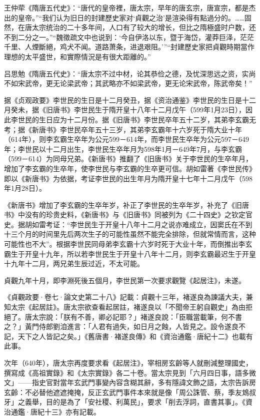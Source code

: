 王仲荦《隋唐五代史》：“唐代的皇帝裡，唐太宗，早年的唐玄宗，唐宣宗，都是杰出的皇帝。”“我们认为旧日的封建歷史家对‘貞觀之治’是渲染得有點過分的。……固然，在唐太宗统治的二十多年间，人口有了较大的增长，但比之隋極盛时户数，还不到二分之一。”“魏徵疏文中也说到：‘今自伊洛以东，暨于海岱，灌莽巨泽，茫茫千里、人煙斷絕，鸡犬不闻。道路萧条，进退艰阻。’”“封建歷史家把貞觀時期當作理想的太平盛世，和實際情況是有很大距離的。”

吕思勉《隋唐五代史》：“唐太宗不过中材，论其恭俭之德，及忧深思远之资，实尚不如宋武帝，更无论梁武帝；其武略亦不如梁武帝，更无论宋武帝，陈武帝矣！”

据《贞观政要》李世民的生日是十二月癸丑，据《资治通鉴》李世民的生日是十二月癸未，据《旧唐书》李世民生于隋开皇十八年十二月戊午（599年1月23日），因此李世民的生日应为十二月份。据《旧唐书》李世民卒年五十二岁，其弟李玄霸无考；据《新唐书》李世民卒年五十三岁，其弟李玄霸年十六岁死于隋大业十年（614年），则李玄霸生卒年为公元599－614年，而李世民生卒年为公元597－649年；李世民以十二月出生，李世民生卒年月为598年1月－649年7月，与李玄霸（599－614）为同母兄弟。《新唐书》推翻了《旧唐书》关于李世民的生卒年月，增加了李玄霸的生卒年，使李世民与李玄霸的生卒更可信。胡如雷著《李世民传》即以《新唐书》为依据，考证李世民的出生年月为隋开皇十七年十二月戊午（598年1月28日）。

《新唐书》增加了李玄霸的生卒年岁，补正了李世民的生卒年岁，补充了《旧唐书》中没有的珍贵史料，《新唐书》与《旧唐书》同被列为《二十四史》之钦定官史。据胡如雷考证：“李世民生于开皇十八年十二月之说亦难成立，因窦氏在不到十三个月的时间里先后两次生子的可能性虽然不能完全排除，但就常情而言，这种可能性也不大”。根据李世民同母弟李玄霸十六岁时死于大业十年，而倒推出李玄霸生于开皇十九年，所以若李世民生于开皇十八年十二月，则李玄霸最迟生于开皇十九年十二月，两兄弟生辰过近，不太可能。

貞觀九年十月，即李淵死後五個月，李世民第一次要求觀覽《起居注》，未遂。

《貞觀政要·卷七·論文史第二十八》記載：貞觀十三年，褚遂良為諫議大夫，兼知太宗《起居註》。唐太宗欲查看起居註，褚遂良以「不聞帝王躬自觀史」為由拒絕了。唐太宗說：「朕有不善，卿必記耶？」褚遂良說：「臣職當載筆，何不書之？」黃門侍郎劉洎進言：「人君有過失，如日月之蝕，人皆見之。設令遂良不記，天下之人皆記之矣。」《舊唐書·褚遂良傳》和《資治通鑑·唐紀十二》也載有此事。

次年（640年），唐太宗再度要求看《起居注》，宰相房玄齡等人就刪減整理國史，撰寫成《高祖實錄》和《太宗實錄》各二十卷。當太宗見到「六月四日事，語多微文」——指史官對當年玄武門事變內容含糊其辭，多有隱諱文飾之語，太宗告訴房玄齡：不必替他遮遮掩掩，反正玄武門事件本來就是像「周公誅管、蔡，季友鴆叔牙」之義舉，目的是為了「安社稷、利萬民」，要求「削去浮詞，直書其事」。《資治通鑑·唐紀十三》亦有記載。

